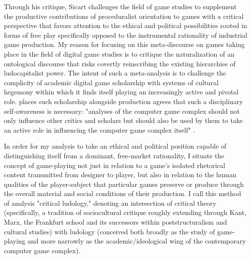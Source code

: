 Through his critique, Sicart challenges the field of game studies to supplement the productive contributions of proceduralist orientation to games with a critical perspective that favors attention to the ethical and political possibilities rooted in forms of free play specifically opposed to the instrumental rationality of industrial game production. My reason for focusing on this meta-discourse on games taking place in the field of digital game studies is to critique the naturalization of an ontological discourse that risks covertly reinscribing the existing hierarchies of ludocapitalist power. The intent of such a meta-analysis is to challenge the complicity of academic digital game scholarship with systems of cultural hegemony within which it finds itself playing an increasingly active and pivotal role. \citeauthor{McAllister2004-mr} places such scholarship alongside production agrees that such a disciplinary self-awareness is necessary: "analyses of the computer game complex should not only influence other critics and scholars but should also be used by them to take an active role in influencing the computer game complex itself" \autocite[49]{McAllister2004-mr}.

In order for my analysis to take an ethical and political position capable of distinguishing itself from a dominant, free-market rationality, I situate the concept of game-playing not just in relation to a game's isolated rhetorical content transmitted from designer to player, but also in relation to the human qualities of the player-subject that particular games preserve or produce through the overall material and social conditions of their production. I call this method of analysis "critical ludology," denoting an intersection of critical theory (specifically, a tradition of sociocultural critique roughly extending through Kant, Marx, the Frankfurt school and its successors within poststructuralism and cultural studies) with ludology (conceived both broadly as the study of game-playing and more narrowly as the academic/ideological wing of the contemporary computer game complex).

